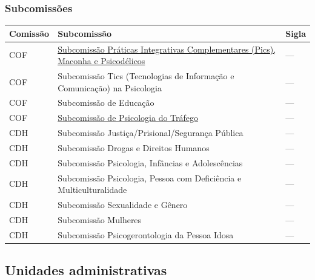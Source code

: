 \subsubsection{Subcomissões}

\begin{center}
	\footnotesize
	\begin{tabularx}{0.8\textwidth}{
			>{\centering\arraybackslash}X
		    >{\centering\arraybackslash}X
			>{\centering\arraybackslash}X  }
		\toprule
\textbf{Comissão} & \textbf{Subcomissão} & \textbf{Sigla} \\
\midrule
COF &
\href{https://transparencia.cfp.org.br/crp06/legislacao/resolucao-crp-06-no-001-16-de-26-de-agosto-de-2016-cria-a-camara-de-mediacao-da-comissao-de-etica-do-conselho-regional-de-psicologia-da-6a-regiao-crp-06-cam-coe-e-aprova-seu-regulamento/}{Subcomissão
Práticas Integrativas Complementares (Pics), Maconha e Psicodélicos} &
--- \\
\midrule
COF &
Subcomissão Tics (Tecnologias de Informação e Comunicação) na Psicologia &
--- \\
\midrule
COF &
Subcomissão de Educação &
--- \\
\midrule
COF &
\href{https://transparencia.cfp.org.br/crp06/legislacao/crp-sp-004-2017-cria-e-estabelece-parametros-para-o-funcionamento-da-comissao-de-auditoria-e-controle-interno-do-conselho/}{Subcomissão
de Psicologia do Tráfego} &
---\\
\midrule
CDH  &
Subcomissão Justiça/Prisional/Segurança Pública &
--- \\
\midrule
CDH &
Subcomissão Drogas e Direitos Humanos &
--- \\
\midrule
CDH &
Subcomissão Psicologia, Infâncias e Adolescências &
--- \\
\midrule
CDH &
Subcomissão Psicologia, Pessoa com Deficiência e Multiculturalidade &
---\\
\midrule
CDH &
Subcomissão Sexualidade e Gênero &
--- \\
\midrule
CDH & Subcomissão Mulheres &
--- \\
\midrule
CDH & Subcomissão Psicogerontologia da Pessoa Idosa &
--- \\
\bottomrule
\end{tabularx}
\end{center}

\subsection{Unidades administrativas}

